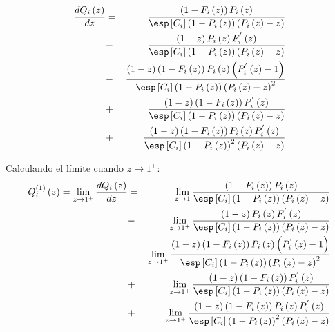 \begin{eqnarray*}
\frac{d Q_{i}\left(z\right)}{d z}&=&\frac{\left(1-F_{i}\left(z\right)\right)P_{i}\left(z\right)}{\esp\left[C_{i}\right]\left(1-P_{i}\left(z\right)\right)\left(P_{i}\left(z\right)-z\right)}\\
&-&\frac{\left(1-z\right)P_{i}\left(z\right)F_{i}^{'}\left(z\right)}{\esp\left[C_{i}\right]\left(1-P_{i}\left(z\right)\right)\left(P_{i}\left(z\right)-z\right)}\\
&-&\frac{\left(1-z\right)\left(1-F_{i}\left(z\right)\right)P_{i}\left(z\right)\left(P_{i}^{'}\left(z\right)-1\right)}{\esp\left[C_{i}\right]\left(1-P_{i}\left(z\right)\right)\left(P_{i}\left(z\right)-z\right)^{2}}\\
&+&\frac{\left(1-z\right)\left(1-F_{i}\left(z\right)\right)P_{i}^{'}\left(z\right)}{\esp\left[C_{i}\right]\left(1-P_{i}\left(z\right)\right)\left(P_{i}\left(z\right)-z\right)}\\
&+&\frac{\left(1-z\right)\left(1-F_{i}\left(z\right)\right)P_{i}\left(z\right)P_{i}^{'}\left(z\right)}{\esp\left[C_{i}\right]\left(1-P_{i}\left(z\right)\right)^{2}\left(P_{i}\left(z\right)-z\right)}
\end{eqnarray*}

Calculando el l\'imite cuando $z\rightarrow1^{+}$:
\begin{eqnarray}
Q_{i}^{(1)}\left(z\right)=\lim_{z\rightarrow1^{+}}\frac{d Q_{i}\left(z\right)}{dz}&=&\lim_{z\rightarrow1}\frac{\left(1-F_{i}\left(z\right)\right)P_{i}\left(z\right)}{\esp\left[C_{i}\right]\left(1-P_{i}\left(z\right)\right)\left(P_{i}\left(z\right)-z\right)}\\
&-&\lim_{z\rightarrow1^{+}}\frac{\left(1-z\right)P_{i}\left(z\right)F_{i}^{'}\left(z\right)}{\esp\left[C_{i}\right]\left(1-P_{i}\left(z\right)\right)\left(P_{i}\left(z\right)-z\right)}\\
&-&\lim_{z\rightarrow1^{+}}\frac{\left(1-z\right)\left(1-F_{i}\left(z\right)\right)P_{i}\left(z\right)\left(P_{i}^{'}\left(z\right)-1\right)}{\esp\left[C_{i}\right]\left(1-P_{i}\left(z\right)\right)\left(P_{i}\left(z\right)-z\right)^{2}}\\
&+&\lim_{z\rightarrow1^{+}}\frac{\left(1-z\right)\left(1-F_{i}\left(z\right)\right)P_{i}^{'}\left(z\right)}{\esp\left[C_{i}\right]\left(1-P_{i}\left(z\right)\right)\left(P_{i}\left(z\right)-z\right)}\\
&+&\lim_{z\rightarrow1^{+}}\frac{\left(1-z\right)\left(1-F_{i}\left(z\right)\right)P_{i}\left(z\right)P_{i}^{'}\left(z\right)}{\esp\left[C_{i}\right]\left(1-P_{i}\left(z\right)\right)^{2}\left(P_{i}\left(z\right)-z\right)}
\end{eqnarray}

